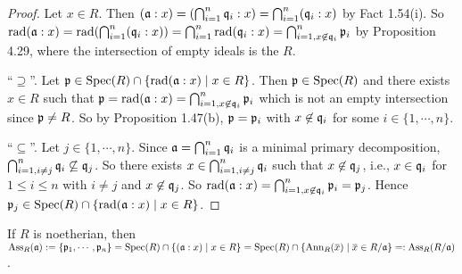 \begin{proof}
    Let $x \in R$. Then $(\mathfrak{a}:x) = (\bigcap_{i=1}^{n} \mathfrak{q}_i:x) = \bigcap_{i=1}^{n} (\mathfrak{q}_i:x)$ by Fact 1.54(i). So $\operatorname{rad}(\mathfrak{a}:x) = \operatorname{rad}(\bigcap_{i=1}^{n}(\mathfrak{q}_i:x)) = \bigcap_{i=1}^{n} \operatorname{rad}(\mathfrak{q}_i:x) = \bigcap_{i=1, x \not \in \mathfrak{q}_i}^{n} \mathfrak{p}_i$ by Proposition 4.29, where the intersection of empty ideals is the $R$. \par
    ``$\supseteq$''. Let $\mathfrak{p} \in \operatorname{Spec}(R) \cap \{\operatorname{rad}(\mathfrak{a}:x) \mid x \in R\}$. Then $\mathfrak{p} \in \operatorname{Spec}(R)$ and there exists $x \in R$ such that $\mathfrak{p} = \operatorname{rad}(\mathfrak{a}:x) = \bigcap_{i=1,x \not \in \mathfrak{q}_i}^{n} \mathfrak{p}_i$  which is not an empty intersection since $\mathfrak{p} \neq R$. So by Proposition 1.47(b), $\mathfrak{p} = \mathfrak{p}_i$ with $x \not\in \mathfrak{q}_i$ for some $i \in \{1,\cdots,n\}$. \par
    ``$\subseteq$''. Let $j \in \{1,\cdots,n\}$. Since $\mathfrak{a} = \bigcap_{i=1}^{n}\mathfrak{q}_i$ is a minimal primary decomposition, $\bigcap_{i=1,i \neq j}^{n} \mathfrak{q}_i \not\subseteq \mathfrak{q}_j$. So there exists $x \in \bigcap_{i=1,i \neq j}^{n} \mathfrak{q}_i$ such that $x \not\in \mathfrak{q}_j$, i.e., $x \in \mathfrak{q}_i$ for $1 \leq i \leq n$ with $i \neq j$ and $x \not \in \mathfrak{q}_j$. So $\operatorname{rad}(\mathfrak{a}:x) = \bigcap_{i=1,x \not \in \mathfrak{q}_i}^{n} \mathfrak{p}_i = \mathfrak{p}_j$. Hence $\mathfrak{p}_j \in \operatorname{Spec}(R) \cap \{\operatorname{rad}(\mathfrak{a}:x) \mid x \in R\}$.
\end{proof}

\begin{theorem}
    If $R$ is noetherian, then $\operatorname{Ass}_R(\ffa) := \{\ffp_1,\cdots,\ffp_n\} = \operatorname{Spec}(R) \cap \{(\ffa:x) \mid x \in R\} = \operatorname{Spec}(R) \cap \{\operatorname{Ann}_R(\overbar{x}) \mid \overbar{x} \in R/\ffa\} =: \operatorname{Ass}_R(R/\ffa)$.
\end{theorem}

